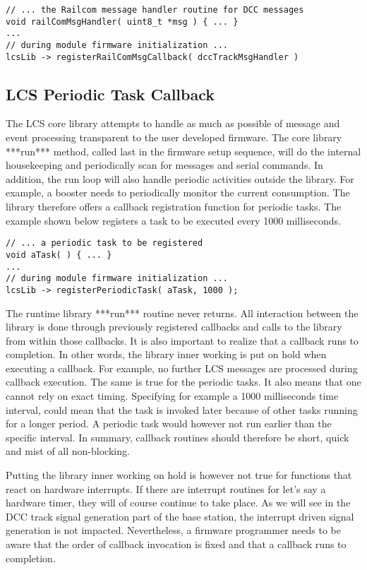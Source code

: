 \lstset{style=codesnippetstyle}
\begin{lstlisting}
// ... the Railcom message handler routine for DCC messages
void railComMsgHandler( uint8_t *msg ) { ... }
...
// during module firmware initialization ...
lcsLib -> registerRailComMsgCallback( dccTrackMsgHandler )
\end{lstlisting}

\subsection{LCS Periodic Task Callback}

The LCS core library attempts to handle as much as possible of message and event processing transparent to the user developed firmware. The core library ***run*** method, called last in the firmware setup sequence, will do the internal housekeeping and periodically scan for messages and serial commands. In addition, the run loop will also handle periodic activities outside the library. For example, a booster needs to periodically monitor the current consumption. The library therefore offers a callback registration function for periodic tasks. The example shown below registers a task to be executed every 1000 milliseconds.

\lstset{style=codesnippetstyle}
\begin{lstlisting}
// ... a periodic task to be registered
void aTask( ) { ... }
...
// during module firmware initialization ...
lcsLib -> registerPeriodicTask( aTask, 1000 );
\end{lstlisting}

The runtime library ***run*** routine never returns. All interaction between the library is done through previously registered callbacks and calls to the library from within those callbacks. It is also important to realize that a callback runs to completion. In other words, the library inner working is put on hold when executing a callback. For example, no further LCS messages are processed during callback execution. The same is true for the periodic tasks. It also means that one cannot rely on exact timing. Specifying for example a 1000 milliseconds time interval, could mean that the task is invoked later because of other tasks running for a longer period. A periodic task would however not run earlier than the specific interval. In summary, callback routines should therefore be short, quick and mist of all non-blocking.

Putting the library inner working on hold is however not true for functions that react on hardware interrupts. If there are interrupt routines for let's say a hardware timer, they will of course continue to take place. As we will see in the DCC track signal generation part of the base station, the interrupt driven signal generation is not impacted. Nevertheless, a firmware programmer needs to be aware that the order of callback invocation is fixed and that a callback runs to completion.



